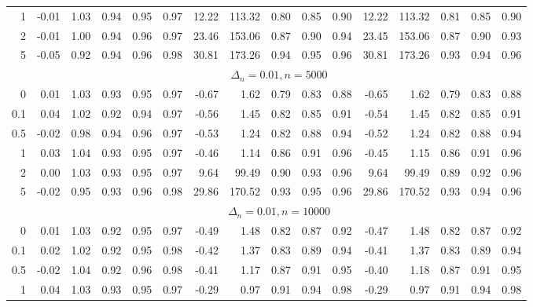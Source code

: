 \documentclass{article}
\theoremstyle{plain}
\theoremstyle{definition}
\theoremstyle{remark}
\begin{document}
\begin{appendix}
{\begin{table}[ht]
\begin{tabular}{r|rrrrr|rrrrr|rrrrr}
  1 & -0.01 & 1.03 & 0.94 & 0.95 & 0.97 & 12.22 & 113.32 & 0.80 & 0.85 & 0.90 & 12.22 & 113.32 & 0.81 & 0.85 & 0.90 \\ 
  2 & -0.01 & 1.00 & 0.94 & 0.96 & 0.97 & 23.46 & 153.06 & 0.87 & 0.90 & 0.94 & 23.45 & 153.06 & 0.87 & 0.90 & 0.93 \\ 
  5 & -0.05 & 0.92 & 0.94 & 0.96 & 0.98 & 30.81 & 173.26 & 0.94 & 0.95 & 0.96 & 30.81 & 173.26 & 0.93 & 0.94 & 0.96 \\
   \midrule
   &\multicolumn{15}{c}{$\Delta_n=0.01, n= 5000$}
   \\
 0 & 0.01 & 1.03 & 0.93 & 0.95 & 0.97 & -0.67 & 1.62 & 0.79 & 0.83 & 0.88 & -0.65 & 1.62 & 0.79 & 0.83 & 0.88 \\ 
  0.1 & 0.04 & 1.02 & 0.92 & 0.94 & 0.97 & -0.56 & 1.45 & 0.82 & 0.85 & 0.91 & -0.54 & 1.45 & 0.82 & 0.85 & 0.91 \\ 
  0.5 & -0.02 & 0.98 & 0.94 & 0.96 & 0.97 & -0.53 & 1.24 & 0.82 & 0.88 & 0.94 & -0.52 & 1.24 & 0.82 & 0.88 & 0.94 \\ 
  1 & 0.03 & 1.04 & 0.93 & 0.95 & 0.97 & -0.46 & 1.14 & 0.86 & 0.91 & 0.96 & -0.45 & 1.15 & 0.86 & 0.91 & 0.96 \\ 
  2 & 0.00 & 1.03 & 0.93 & 0.95 & 0.97 & 9.64 & 99.49 & 0.90 & 0.93 & 0.96 & 9.64 & 99.49 & 0.89 & 0.92 & 0.96 \\ 
  5 & -0.02 & 0.95 & 0.93 & 0.96 & 0.98 & 29.86 & 170.52 & 0.93 & 0.95 & 0.96 & 29.86 & 170.52 & 0.93 & 0.94 & 0.96 \\ 
   \midrule
   &\multicolumn{15}{c}{$\Delta_n=0.01, n= 10000$}
   \\
 0 & 0.01 & 1.03 & 0.92 & 0.95 & 0.97 & -0.49 & 1.48 & 0.82 & 0.87 & 0.92 & -0.47 & 1.48 & 0.82 & 0.87 & 0.92 \\ 
  0.1 & 0.02 & 1.02 & 0.92 & 0.95 & 0.98 & -0.42 & 1.37 & 0.83 & 0.89 & 0.94 & -0.41 & 1.37 & 0.83 & 0.89 & 0.94 \\ 
  0.5 & -0.02 & 1.04 & 0.92 & 0.96 & 0.98 & -0.41 & 1.17 & 0.87 & 0.91 & 0.95 & -0.40 & 1.18 & 0.87 & 0.91 & 0.95 \\ 
  1 & 0.04 & 1.03 & 0.93 & 0.95 & 0.97 & -0.29 & 0.97 & 0.91 & 0.94 & 0.98 & -0.29 & 0.97 & 0.91 & 0.94 & 0.98 \\ 

\end{tabular}
\end{table}}
\end{appendix}
\end{document}
